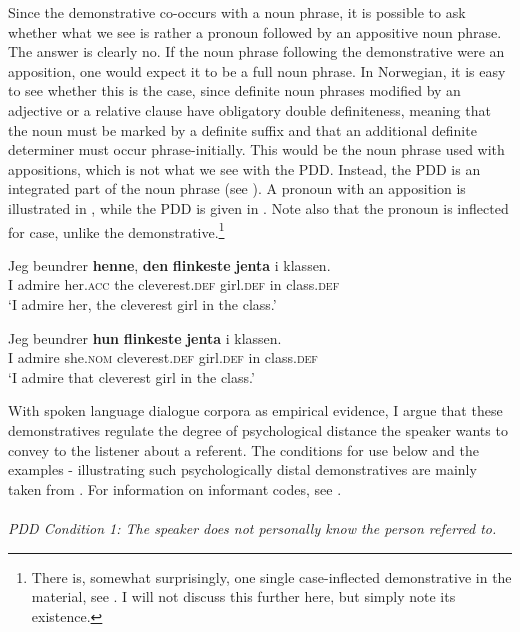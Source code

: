 \documentclass[output=paper,colorlinks,citecolor=brown]{langscibook}
\begin{document}
Since the demonstrative co-occurs with a noun phrase, it is possible to ask whether what we see is rather a pronoun followed by an appositive noun phrase. The answer is clearly no. If the noun phrase following the demonstrative were an apposition, one would expect it to be a full noun phrase. In Norwegian, it is easy to see whether this is the case, since definite noun phrases modified by an adjective or a relative clause have obligatory double definiteness, meaning that the noun must be marked by a definite suffix and that an additional definite determiner must occur phrase-initially. This would be the noun phrase used with appositions, which is not what we see with the PDD. Instead, the PDD is an integrated part of the noun phrase (see \citealt[185-187]{Johannessen2008}). A pronoun with an apposition is illustrated in , while the PDD is given in . Note also that the pronoun is inflected for case, unlike the demonstrative.\footnote{There is, somewhat surprisingly, one single case-inflected demonstrative in the material, see . I will not discuss this further here, but simply note its existence.} 

\ea\label{ex:johannessen:2}
 \gll Jeg beundrer \textbf{henne}, \textbf{den} \textbf{flinkeste} \textbf{jenta} i klassen.\\
     I admire her.\textsc{acc} the cleverest.\textsc{def} girl.\textsc{def} in class.\textsc{def}\\
\glt ‘I admire her, the cleverest girl in the class.’
\z

\ea\label{ex:johannessen:3}
 \gll Jeg beundrer \textbf{hun} \textbf{flinkeste} \textbf{jenta} i klassen.\\
     I admire she.\textsc{nom} cleverest.\textsc{def} girl.\textsc{def} in class.\textsc{def}\\
\glt ‘I admire that cleverest girl in the class.’
\z

With spoken language dialogue corpora as empirical evidence, I argue that these demonstratives regulate the degree of psychological distance the speaker wants to convey to the listener about a referent. The conditions for use below and the examples - illustrating such psychologically distal demonstratives are mainly taken from \citet[164-167]{Johannessen2008}. For information on informant codes, see .\\
\\
\textit{PDD Condition 1: The speaker does not personally know the person referred to.}
\end{document}

